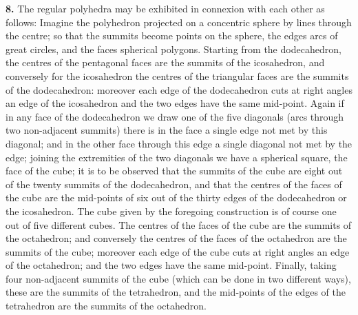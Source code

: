 \documentclass[11pt]{article}
\begin{document}
\textbf{8.} The regular polyhedra may be exhibited in connexion with each other as follows: Imagine the polyhedron projected on a concentric sphere by lines through the centre; so that the summits become points on the sphere, the edges arcs of great circles, and the faces spherical polygons. Starting from the dodecahedron, the centres of the pentagonal faces are the summits of the icosahedron, and conversely for the icosahedron the centres of the triangular faces are the summits of the dodecahedron: moreover each edge of the dodecahedron cuts at right angles an edge of the icosahedron and the two edges have the same mid-point. Again if in any face of the dodecahedron we draw one of the five diagonals (arcs through two non-adjacent summits) there is in the face a single edge not met by this diagonal; and in the other face through this edge a single diagonal not met by the edge; joining the extremities of the two diagonals we have a spherical square, the face of the cube; it is to be observed that the summits of the cube are eight out of the twenty summits of the dodecahedron, and that the centres of the faces of the cube are the mid-points of six out of the thirty edges of the dodecahedron or the icosahedron. The cube given by the foregoing construction is of course one out of five different cubes. The centres of the faces of the cube are the summits of the octahedron; and conversely the centres of the faces of the octahedron are the summits of the cube; moreover each edge of the cube cuts at right angles an edge of the octahedron; and the two edges have the same mid-point. Finally, taking four non-adjacent summits of the cube (which can be done in two different ways), these are the summits of the tetrahedron, and the mid-points of the edges of the tetrahedron are the summits of the octahedron.
\end{document}
